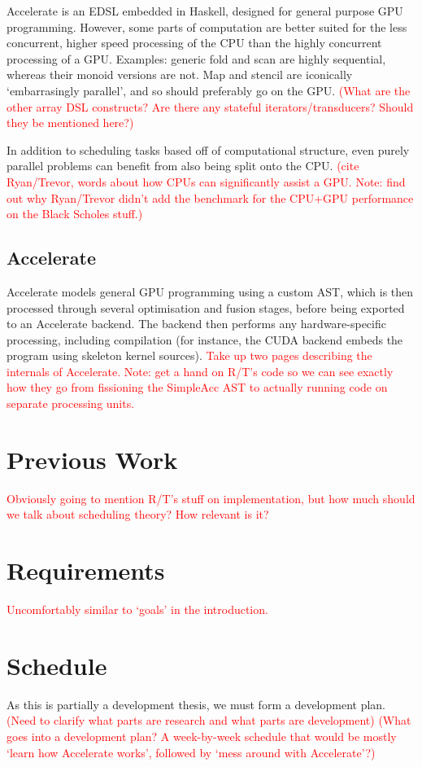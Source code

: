 \documentclass[a4paper,12pt]{article}
\newcommand{\red}[1]{\textcolor{red}{#1}}
\begin{document}
\begin{multicols*}{2}
Accelerate is an EDSL embedded in Haskell, designed for general purpose GPU programming. However, some parts of computation are better suited for the less concurrent, higher speed processing of the CPU than the highly concurrent processing of a GPU. Examples: generic fold and scan are highly sequential, whereas their monoid versions are not. Map and stencil are iconically `embarrasingly parallel', and so should preferably go on the GPU. \red{(What are the other array DSL constructs? Are there any stateful iterators/transducers? Should they be mentioned here?)}

In addition to scheduling tasks based off of computational structure, even purely parallel problems can benefit from also being split onto the CPU. \red{(cite Ryan/Trevor, words about how CPUs can significantly assist a GPU. Note: find out why Ryan/Trevor didn't add the benchmark for the CPU+GPU performance on the Black Scholes stuff.)}

\subsection{Accelerate}

Accelerate models general GPU programming using a custom AST, which is then processed through several optimisation and fusion stages, before being exported to an Accelerate backend. The backend then performs any hardware-specific processing, including compilation (for instance, the CUDA backend embeds the program using skeleton kernel sources). \red{Take up two pages describing the internals of Accelerate. Note: get a hand on R/T's code so we can see exactly how they go from fissioning the SimpleAcc AST to actually running code on separate processing units.}


\section{Previous Work}

\red{Obviously going to mention R/T's stuff on implementation, but how much should we talk about scheduling theory? How relevant is it?}


\section{Requirements}

\red{Uncomfortably similar to `goals' in the introduction.}


\section{Schedule}

As this is partially a development thesis, we must form a development plan. \red{(Need to clarify what parts are research and what parts are development) (What goes into a development plan? A week-by-week schedule that would be mostly `learn how Accelerate works', followed by `mess around with Accelerate'?)}



\begin{thebibliography}{99}
\end{thebibliography}

\end{multicols*}
\end{document}
